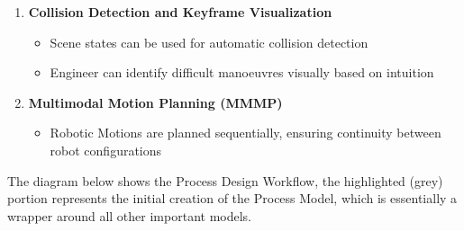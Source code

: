 \begin{enumerate}
	\item \textbf{Collision Detection and Keyframe Visualization}
	\begin{itemize}
		\item Scene states can be used for automatic collision detection
		\item Engineer can identify difficult manoeuvres visually based on intuition 
	\end{itemize}

    \item \textbf{Multimodal Motion Planning (MMMP)}
	\begin{itemize}
		\item Robotic Motions are planned sequentially, ensuring continuity between robot configurations 
	\end{itemize}
\end{enumerate}

The diagram below shows the Process Design Workflow, the highlighted (grey) portion represents the initial creation of the Process Model, which is essentially a wrapper around all other important models. 





